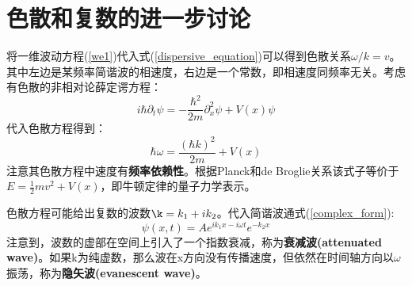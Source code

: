\documentclass[12pt]{ctexart}%
\begin{document}
\section*{色散和复数的进一步讨论}
将一维波动方程(\ref{we1})代入式(\ref{dispersive_equation})可以得到色散关系$\omega/k=v$。其中左边是某频率简谐波的相速度，右边是一个常数，即相速度同频率无关。考虑有色散的非相对论薛定谔方程：
\begin{equation}
    i\hbar\partial_t\psi=-\frac{\hbar^2}{2m}\partial_x^2\psi+V(x)\psi
\end{equation}
代入色散方程得到：
\begin{equation}
    \hbar\omega=\frac{(\hbar k)^2}{2m}+V(x)
\end{equation}
注意其色散方程中速度有\textbf{频率依赖性}。根据Planck和de Broglie关系该式子等价于$E=\frac{1}{2}mv^2+V(x)$，即牛顿定律的量子力学表示。
\par 色散方程可能给出复数的波数$\k=k_1+ik_2$。代入简谐波通式(\ref{complex_form}):
\begin{equation}
    \psi(x,t)=Ae^{ik_1x-i\omega t}e^{-k_2x}
\end{equation}
注意到，波数的虚部在空间上引入了一个指数衰减，称为\textbf{衰减波(attenuated wave)}。如果k为纯虚数，那么波在x方向没有传播速度，但依然在时间轴方向以$\omega$振荡，称为\textbf{隐矢波(evanescent wave)}。
\end{document}
